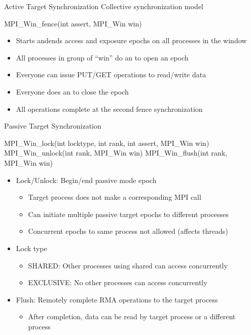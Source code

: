 \documentclass[aspectratio=43]{beamer}
\begin{document}
\begin{frame}[fragile]{Active Target Synchronization}
Collective synchronization model
\begin{Pseudolisting}[]{}
MPI_Win_fence(int assert, MPI_Win win)
\end{Pseudolisting}
\begin{itemize}
    \item Starts andends access and exposure epochs on all processes in the window
    \item All processes in group of “win” do an  to open an epoch
    \item Everyone can issue PUT/GET operations to read/write data
    \item Everyone does an  to close the epoch
    \item All operations complete at the second fence synchronization
\end{itemize}
\end{frame}


\begin{frame}[fragile]{Passive Target Synchronization}
\begin{Pseudolisting}[]{}
MPI_Win_lock(int locktype, int rank, int assert, MPI_Win win)
MPI_Win_unlock(int rank, MPI_Win win)
MPI_Win_flush(int rank, MPI_Win win)
\end{Pseudolisting}
\begin{itemize}
    \item Lock/Unlock: Begin/end passive mode epoch
    \begin{itemize}
        \item Target process does not make a corresponding MPI call
        \item Can initiate multiple passive target epochs to different processes
        \item Concurrent epochs to same process not allowed (affects threads)
    \end{itemize}
\item Lock type
    \begin{itemize}
    \item SHARED: Other processes using shared can access concurrently
    \item EXCLUSIVE: No other processes can access concurrently
    \end{itemize}
\item Flush: Remotely complete RMA operations to the target process
    \begin{itemize}
    \item After completion, data can be read by target process or a different process
    \end{itemize}
\end{itemize}
\end{frame}
\end{document}
